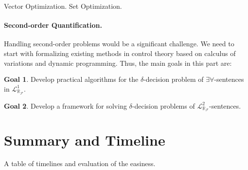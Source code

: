 \documentclass[10pt]{article}
\newcommand{\lrf}{\mathcal{L}_{\mathbb{R}_{\mathcal{F}}}}
\theoremstyle{definition}
\newtheorem{goal}{Goal}
\begin{document}
Vector Optimization. Set Optimization. 

\paragraph{Second-order Quantification.} Handling second-order problems would be a significant challenge. We need to start with formalizing existing methods in control theory based on calculus of variations and dynamic programming. Thus, the main goals in this part are:

\begin{goal}
Develop practical algorithms for the $\delta$-decision problem of $\exists\forall$-sentences in $\lrf^1$.
\end{goal}
\begin{goal}
Develop a framework for solving $\delta$-decision problems of $\lrf^2$-sentences.
\end{goal}




\section{Summary and Timeline}

A table of timelines and evaluation of the easiness. 














\end{document}
